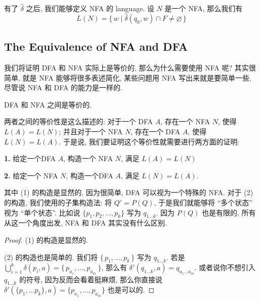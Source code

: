 \documentclass[../main_part1.tex]{subfiles}
\begin{document}
有了 \( \hat{\delta} \) 之后, 我们能够定义 NFA 的 language. 设 \(N\) 是一个 NFA, 那么我们有
\[
L (N) = \{ \, w \mid \hat{\delta} (q_{0} ,w ) \cap F \ne \varnothing \, \}
\]



\subsection{The Equivalence of NFA and DFA}
我们将证明 DFA 和 NFA 实际上是等价的, 那么为什么需要使用 NFA 呢? 其实很简单, 就是 NFA 能够将很多表述简化, 某些问题用 NFA 写出来就是要简单一些, 尽管说 NFA 和 DFA 的能力是一样的.
\begin{thm}[DFA = NFA]
\label{DFA = NFA}
DFA 和 NFA 之间是等价的.
\end{thm}
两者之间的等价性是这么描述的: 对于一个 DFA \(A\), 存在一个 NFA \(N\), 使得 \(L (A) =  L (N)\); 并且对于一个 NFA \(N\), 存在一个 DFA \(A\), 使得 \(L(N) =  L(A)\). 于是说, 我们要证明这个等价性就需要进行两方面的证明:

\medskip
{\setlength{\parindent}{40pt}%
\textbf{1.} 给定一个DFA \(A\), 构造一个 NFA \(N\), 满足 \(L (A) = L (N)\)

\smallskip
\textbf{2.} 给定一个 NFA \(N\), 构造一个DFA \(A\), 满足 \(L (N)  = L (A)\).
}
\medskip

其中 (1) 的构造是显然的, 因为很简单, DFA 可以视为一个特殊的 NFA. 对于 (2) 的构造, 我们使用的子集构造法: 将 \(Q ' = P (Q)\), 于是我们就能够将 ``多个状态'' 视为 ``单个状态''. 比如说 \( \{ p _{1} ,  p _{2}, \dots, p _{k}\} \) 写为 \(q _{1 \dots k}\). 因为 \(P (Q)\) 也是有限的, 所有从这一个角度出发, NFA 和 DFA 其实没有什么区别. 

\begin{proof}[Proof]
\noindent (1) 的构造是显然的.

\noindent (2) 的构造也是简单的. 我们将 \( \{ \, p_{1}, \dots, p_{k} \, \}\) 写为 \( q _{1\dots k}\).
若是 \(\bigcup_{i=1}^{k}\delta ( p_{i} , a) = \{ \,  p_{a_{1}},\dots, p_{a _{m}}\, \}\), 那么有 \(\delta' ( q _{1 \dots k} , a) = q _{a_{1}\dots a_{m}}\). 或者说你不想引入 \( q_{1 \dots k}\) 的符号, 因为反而会看着挺麻烦, 那么你直接说 \(\delta ' ( \{ p_{1} , \dots p_{k} \}, a ) = \{p _{a_{1}}, \dots , p_{a_{m}}\}\) 也是可以的. 
\end{proof}

\end{document}
